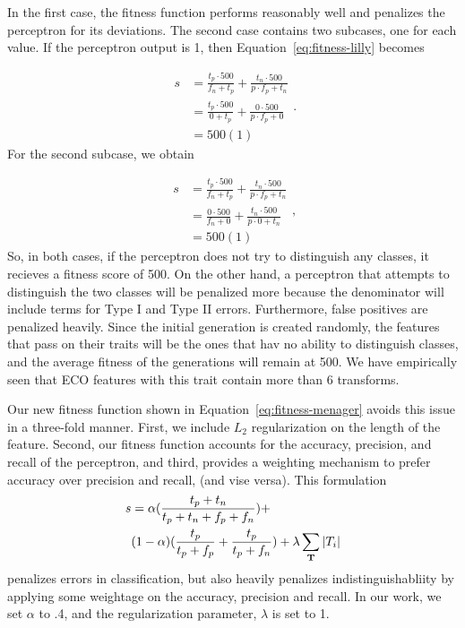 \documentclass[conference]{IEEEtran}
\begin{document}
In the first case, the fitness function performs reasonably well and penalizes the perceptron for its deviations. The second case contains two subcases, one for each value. If the perceptron output is 1, then Equation~\ref{eq:fitness-lilly} becomes

\begin{equation}
  \begin{split}
    s & = \frac{t_p \cdot 500}{f_n + t_p} + \frac{t_n \cdot 500}{p \cdot f_p+ t_n}\\
    & = \frac{t_p \cdot 500}{0 + t_p} + \frac{0 \cdot 500}{p \cdot f_p + 0}\\
    & = 500(1)
  \end{split}.
  \label{eq:fitness-lilly-decompose}
\end{equation}
For the second subcase, we obtain

\begin{equation}
  \begin{split}
    s & = \frac{t_p \cdot 500}{f_n + t_p} + \frac{t_n \cdot 500}{p \cdot f_p+ t_n}\\
    & = \frac{0 \cdot 500}{f_n + 0} + \frac{t_n \cdot 500}{p \cdot 0 + t_n}\\
    & = 500(1)
  \end{split},
  \label{eq:fitness-lilly-decompose2}
\end{equation}
So, in both cases, if the perceptron does not try to distinguish any classes, it recieves a fitness score of 500. On the other hand, a perceptron that attempts to distinguish the two classes will be penalized more because the denominator will include terms for Type I and Type II errors. Furthermore, false positives are penalized heavily. Since the initial generation is created randomly, the features that pass on their traits will be the ones that hav no ability to distinguish classes, and the average fitness of the generations will remain at 500. We have empirically seen that ECO features with this trait contain more than 6 transforms.

Our new fitness function shown in Equation~\ref{eq:fitness-menager} avoids this issue in a three-fold manner. First, we include $L_2$ regularization on the length of the feature. Second, our fitness function accounts for the accuracy, precision, and recall of the perceptron, and third, provides a weighting mechanism to prefer accuracy over precision and recall, (and vise versa). This formulation
\begin{equation}
  \begin{split}
    s & = \alpha(\frac{t_p + t_n}{t_p + t_n + f_p + f_n}) +\\
    &(1 - \alpha)(\frac{t_p}{t_p + f_p} + \frac{t_p}{t_p + f_n}) + \lambda \sum_{\bf T} |T_i|
    \end{split}
  \label{eq:fitness-menager}
\end{equation}
penalizes errors in classification, but also heavily penalizes indistinguishabliity by applying some weightage on the accuracy, precision and recall. In our work, we set $\alpha$ to .4, and the regularization parameter, $\lambda$ is set to 1.
\end{document}
